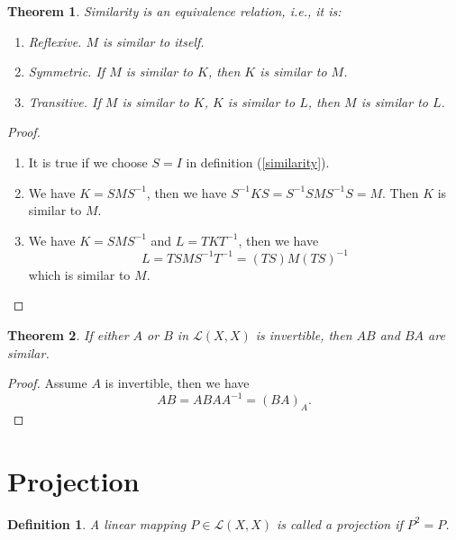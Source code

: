\documentclass[11pt]{book}
\newtheorem{definition}{Definition}[section]
\newtheorem{theorem}{Theorem}[section]
\theoremstyle{definition}
\numberwithin{equation}{subsection}
\begin{document}
\begin{theorem}
Similarity is an equivalence relation, i.e., it is:
\begin{enumerate}[label=(\roman*)]
    \item Reflexive. $M$ is similar to itself.
    \item Symmetric. If $M$ is similar to $K$, then $K$ is similar to $M$.
    \item Transitive. If $M$ is similar to $K$, $K$ is similar to $L$, then $M$ is similar to $L$.
\end{enumerate}
\end{theorem}
\begin{proof}
~\begin{enumerate}[label=(\roman*)]
    \item It is true if we choose $S=I$ in definition (\ref{similarity}).
    \item We have $K = SMS^{-1}$, then we have $S^{-1}KS = S^{-1} S M S^{-1} S = M$. Then $K$ is similar to $M$.
    \item We have $K = SMS^{-1}$ and $L=TKT^{-1}$, then we have $$L = TSMS^{-1}T^{-1} = (TS)M(TS)^{-1}$$ which is similar to $M$.
\end{enumerate}
\end{proof}

\medskip

\begin{theorem}
If either $A$ or $B$ in $\mathscr{L}(X,X)$ is invertible, then $AB$ and $BA$ are similar.
\end{theorem}
\begin{proof}
Assume $A$ is invertible, then we have 
$$AB = ABAA^{-1} = (BA)_A.$$
\end{proof}

\medskip

\section{Projection}
\begin{definition}
A linear mapping $P\in \mathscr{L}(X,X)$ is called a projection if $P^2=P$.
\end{definition}

\medskip
\end{document}

